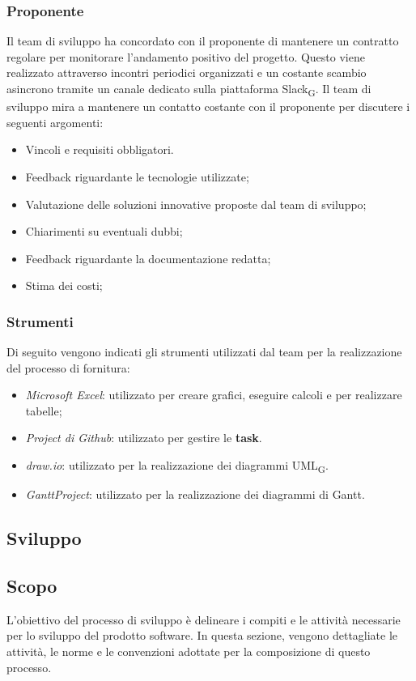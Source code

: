 \documentclass{article}
\begin{document}
\subsubsection{Proponente}
Il team di sviluppo ha concordato con il proponente di mantenere un contratto regolare per monitorare l'andamento positivo del progetto. Questo viene realizzato attraverso incontri periodici organizzati e un costante scambio asincrono tramite un canale dedicato sulla piattaforma Slack\textsubscript{G}. Il team di sviluppo mira a mantenere un contatto costante con il proponente per discutere i seguenti argomenti:
\begin{itemize}
    \item Vincoli e requisiti obbligatori.
    \item Feedback riguardante le tecnologie utilizzate;
    \item Valutazione delle soluzioni innovative proposte dal team di sviluppo;
    \item Chiarimenti su eventuali dubbi;
    \item Feedback riguardante la documentazione redatta;
    \item Stima dei costi;
\end{itemize}

\subsubsection*{Strumenti}
Di seguito vengono indicati gli strumenti utilizzati dal team per la realizzazione del processo di fornitura:\begin{itemize}
    \item \textit{Microsoft Excel}: utilizzato per creare grafici, eseguire calcoli e per realizzare tabelle;
    \item \textit{Project di Github}: utilizzato per gestire le \textbf{task}.
    \item \textit{draw.io}: utilizzato per la realizzazione dei diagrammi UML\textsubscript{G}.
    \item \textit{GanttProject}: utilizzato per la realizzazione dei diagrammi di Gantt.
\end{itemize}

\subsection{Sviluppo}

\subsection{Scopo}
L'obiettivo del processo di sviluppo è delineare i compiti e le attività necessarie per lo sviluppo del prodotto software. In questa sezione, vengono dettagliate le attività, le norme e le convenzioni adottate per la composizione di questo processo.
\end{document}
